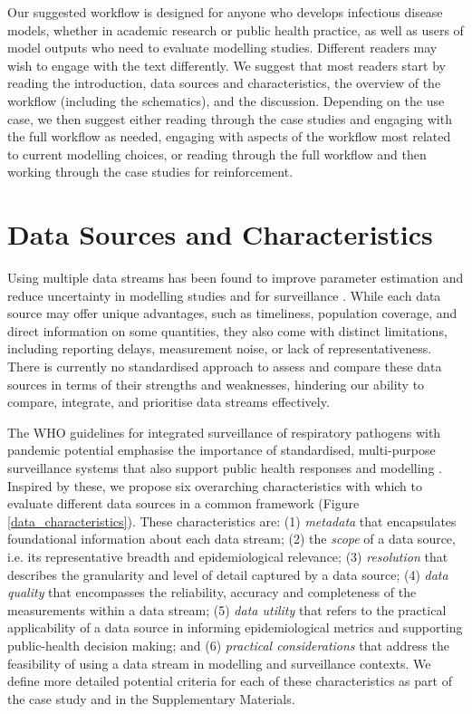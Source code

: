 \documentclass{article}
\begin{document}
Our suggested workflow is designed for anyone who develops infectious disease models, whether in academic research or public health practice, as well as users of model outputs who need to evaluate modelling studies. 
Different readers may wish to engage with the text differently.
We suggest that most readers start by reading the introduction, data sources and characteristics, the overview of the workflow (including the schematics), and the discussion.
Depending on the use case, we then suggest either reading through the case studies and engaging with the full workflow as needed, engaging with aspects of the workflow most related to current modelling choices, or reading through the full workflow and then working through the case studies for reinforcement.

\section{Data Sources and Characteristics} \label{sec:datareview}

Using multiple data streams has been found to improve parameter estimation and reduce uncertainty in modelling studies and for surveillance \citep{deangelis2018analysing, sherratt2021exploring}. While each data source may offer unique advantages, such as timeliness, population coverage, and direct information on some quantities, they also come with distinct limitations, including reporting delays,  measurement noise, or lack of representativeness. There is currently no standardised approach to assess and compare these data sources in terms of their strengths and weaknesses, hindering our ability to compare, integrate, and prioritise data streams effectively. 

The WHO guidelines for integrated surveillance of respiratory pathogens with pandemic potential emphasise the importance of standardised, multi-purpose surveillance systems that also support public health responses and modelling \citep{world2024implementing}. Inspired by these, we propose six overarching characteristics with which to evaluate different data sources in a common framework (Figure \ref{data_characteristics}).  These characteristics are: (1) \textit{metadata}  that encapsulates foundational information about each data stream; (2) the \textit{scope} of a data source, i.e. its representative breadth and epidemiological relevance; (3) \textit{resolution} that describes the granularity and level of detail captured by a data source; (4) \textit{data quality} that encompasses the reliability, accuracy and completeness of the measurements within a data stream; (5) \textit{data utility} that refers to the practical applicability of a data source in informing epidemiological metrics and supporting public-health decision making; and (6)\textit{ practical considerations} that address the feasibility of using a data stream in modelling and surveillance contexts. We define more detailed potential criteria for each of these characteristics as part of the case study and in the Supplementary Materials. 
\end{document}
